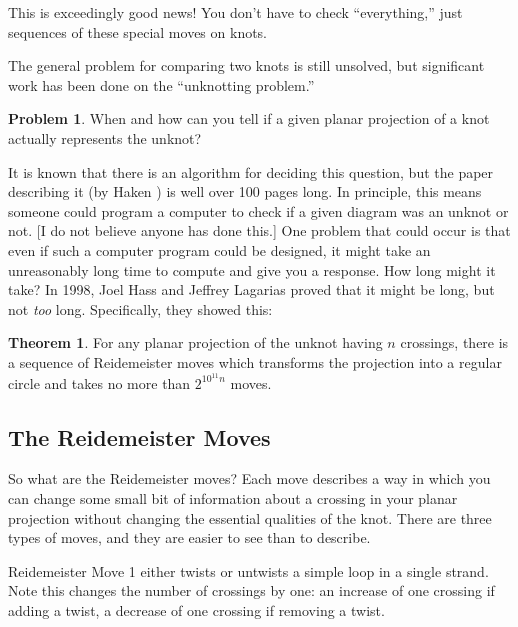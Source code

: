 \documentclass[12pt,letterpaper]{article}
\theoremstyle{definition}
\newtheorem*{theorem}{Theorem}
\newtheorem*{problem}{Problem}
\begin{document}
This is exceedingly good news!
You don't have to check ``everything,'' just sequences of these special moves on knots.

The general problem for comparing two knots is still unsolved, but significant work has been done on the ``unknotting problem.''
\begin{problem}
When and how can you tell if a given planar projection of a knot actually represents the unknot?
\end{problem}
It is known that there is an algorithm for deciding this question, but the paper describing it  (by Haken \cite{Haken}) is well over 100 pages long.
In principle, this means someone could program a computer to check if a given diagram was an unknot or not.
[I do not believe anyone has done this.]
One problem that could occur is that even if such a computer program could be designed, it might take an unreasonably long time to compute and give you a response.
How long might it take?
In 1998, Joel Hass and Jeffrey Lagarias proved that it might be long, but not \emph{too} long.
Specifically, they showed this:
\begin{theorem}
For any planar projection of the unknot having $n$ crossings, there is a sequence of Reidemeister moves which transforms the projection into a regular circle and takes no more than $2^{10^{11}n}$ moves.
\end{theorem}



\subsection*{The Reidemeister Moves}

So what are the Reidemeister moves?
Each move describes a way in which you can change some small bit of information about a crossing in your planar projection without changing the essential qualities of the knot.
There are three types of moves, and they are easier to see than to describe.

Reidemeister Move 1 either twists or untwists a simple loop in a single strand.
Note this changes the number of crossings by one: an increase of one crossing if adding a twist, a decrease of one crossing if removing a twist.
\end{document}
